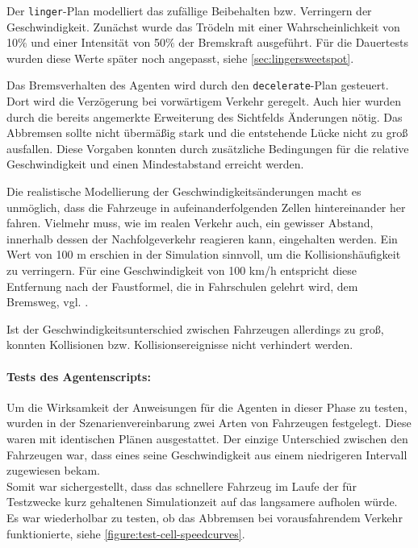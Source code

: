 Der \texttt{linger}-Plan modelliert das zufällige Beibehalten bzw. Verringern der Geschwindigkeit. 
Zunächst wurde das Trödeln mit einer Wahrscheinlichkeit von \mbox{10$\%$} und einer Intensität von \mbox{50$\%$} der Bremskraft ausgeführt.
Für die Dauertests wurden diese Werte später noch angepasst, siehe \cref{sec:lingersweetspot}.

Das Bremsverhalten des Agenten wird durch den \texttt{decelerate}-Plan gesteuert. 
Dort wird die Verzögerung bei vorwärtigem Verkehr geregelt.
Auch hier wurden durch die bereits angemerkte Erweiterung des Sichtfelds Änderungen nötig. 
Das Abbremsen sollte nicht übermäßig stark und die entstehende Lücke nicht zu groß ausfallen. 
Diese Vorgaben konnten durch zusätzliche Bedingungen für die relative Geschwindigkeit und einen Mindestabstand erreicht werden.

Die realistische Modellierung 
der Geschwindigkeitsänderungen macht es unmöglich, dass die Fahrzeuge in aufeinanderfolgenden Zellen hintereinander her fahren.
Vielmehr muss, wie im realen Verkehr auch, ein gewisser Abstand, innerhalb dessen der Nachfolgeverkehr reagieren kann, eingehalten werden.
Ein Wert von 100 m erschien in der Simulation sinnvoll, um die Kollisionshäufigkeit zu verringern. 
Für eine Geschwindigkeit von 100 km/h entspricht diese Entfernung nach der Faustformel, die in Fahrschulen gelehrt wird, dem Bremsweg, vgl. \cite{bremsweg}.

Ist der Geschwindigkeitsunterschied zwischen Fahrzeugen allerdings zu groß, konnten Kollisionen bzw. Kollisionsereignisse nicht verhindert werden.

\paragraph*{Tests des Agentenscripts:}
Um die Wirksamkeit der Anweisungen für die Agenten in dieser Phase zu testen, wurden in der Szenarienvereinbarung zwei Arten von Fahrzeugen festgelegt.
Diese waren mit identischen Plänen ausgestattet.
Der einzige Unterschied zwischen den Fahrzeugen war, dass eines seine Geschwindigkeit aus einem niedrigeren Intervall zugewiesen bekam.
\\
Somit war sichergestellt, dass das schnellere Fahrzeug im Laufe der für Testzwecke kurz gehaltenen Simulationzeit auf das langsamere aufholen würde.
Es war wiederholbar zu testen, ob das Abbremsen bei vorausfahrendem Verkehr funktionierte, siehe \cref{figure:test-cell-speedcurves}.

